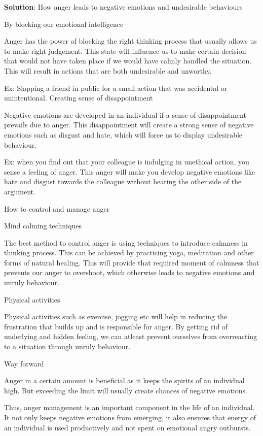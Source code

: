 \documentclass[
]{book}
\newenvironment{solution}{ {\bfseries Solution}:}{}
\begin{document}
\begin{questions}
\begin{solution}
How anger leads to negative emotions and undesirable behaviours

By blocking our emotional intelligence

Anger has the power of blocking the right thinking process that usually allows us to make right judgement. This state will influence us to make certain decision that would not have taken place if we would have calmly handled the situation. This will result in actions that are both undesirable and unworthy.

Ex: Slapping a friend in public for a small action that was accidental or unintentional.
    Creating sense of disappointment

Negative emotions are developed in an individual if a sense of disappointment prevails due to anger. This disappointment will create a strong sense of negative emotions such as disgust and hate, which will force us to display undesirable behaviour.

Ex: when you find out that your colleague is indulging in unethical action, you sense a feeling of anger. This anger will make you develop negative emotions like hate and disgust towards the colleague without hearing the other side of the argument.

How to control and manage anger

Mind calming techniques

The best method to control anger is using techniques to introduce calmness in thinking process. This can be achieved by practicing yoga, meditation and other forms of natural healing. This will provide that required moment of calmness that prevents our anger to overshoot, which otherwise leads to negative emotions and unruly behaviour.

Physical activities

Physical activities such as exercise, jogging etc will help in reducing the frustration that builds up and is responsible for anger. By getting rid of underlying and hidden feeling, we can atleast prevent ourselves from overreacting to a situation through unruly behaviour.

Way forward

Anger in a certain amount is beneficial as it keeps the spirits of an individual high. But exceeding the limit will usually create chances of negative emotions.

Thus, anger management is an important component in the life of an individual. It not only keeps negative emotions from emerging, it also ensures that energy of an individual is used productively and  not spent on emotional angry outbursts.


\end{solution}
\end{questions}
\end{document}
